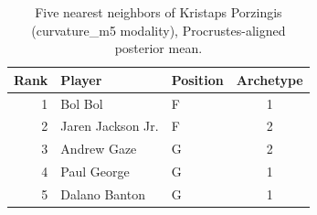\begin{table}[htbp]
  \centering\small
  \begin{tabular}{rllc}
    \toprule
    Rank & Player & Position & Archetype \\
    \midrule
    1 & Bol Bol & F & 1 \\
    2 & Jaren Jackson Jr. & F & 2 \\
    3 & Andrew Gaze & G & 2 \\
    4 & Paul George & G & 1 \\
    5 & Dalano Banton & G & 1 \\
    \bottomrule
  \end{tabular}
  \caption{Five nearest neighbors of Kristaps Porzingis (curvature_m5 modality), Procrustes-aligned posterior mean.}
  \label{tab:Kristaps_Porzingis_neighbors_curvature_m5}
\end{table}

